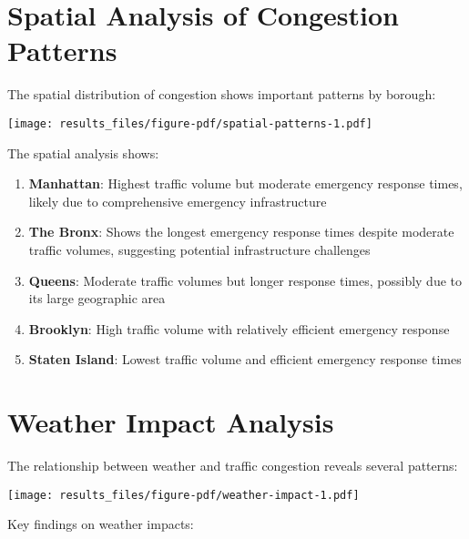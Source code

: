 \documentclass[
  letterpaper,
  DIV=11,
  numbers=noendperiod]{scrreprt}
\begin{document}
\section{Spatial Analysis of Congestion
Patterns}\label{spatial-analysis-of-congestion-patterns}

The spatial distribution of congestion shows important patterns by
borough:

\texttt{[image: results\_files/figure-pdf/spatial-patterns-1.pdf]}

The spatial analysis shows:

\begin{enumerate}
\def\labelenumi{\arabic{enumi}.}
\item
  \textbf{Manhattan}: Highest traffic volume but moderate emergency
  response times, likely due to comprehensive emergency infrastructure
\item
  \textbf{The Bronx}: Shows the longest emergency response times despite
  moderate traffic volumes, suggesting potential infrastructure
  challenges
\item
  \textbf{Queens}: Moderate traffic volumes but longer response times,
  possibly due to its large geographic area
\item
  \textbf{Brooklyn}: High traffic volume with relatively efficient
  emergency response
\item
  \textbf{Staten Island}: Lowest traffic volume and efficient emergency
  response times
\end{enumerate}

\section{Weather Impact Analysis}\label{weather-impact-analysis}

The relationship between weather and traffic congestion reveals several
patterns:

\texttt{[image: results\_files/figure-pdf/weather-impact-1.pdf]}

Key findings on weather impacts:
\end{document}
